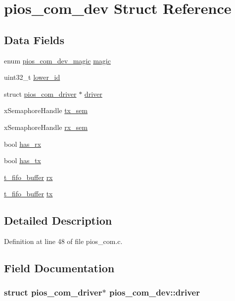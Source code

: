 \hypertarget{structpios__com__dev}{\section{pios\-\_\-com\-\_\-dev \-Struct \-Reference}
\label{structpios__com__dev}
}
\subsection*{\-Data \-Fields}
\begin{DoxyCompactItemize}
\item 
enum \hyperlink{group___p_i_o_s___c_o_m_ga57d90f793d1e8323599fd11e929c945d}{pios\-\_\-com\-\_\-dev\-\_\-magic} \hyperlink{structpios__com__dev_ac886360255eb683d1be8e60bde922e69}{magic}
\item 
uint32\-\_\-t \hyperlink{structpios__com__dev_a3447468fdb0c7996c3669046d48b4cb6}{lower\-\_\-id}
\item 
struct \hyperlink{structpios__com__driver}{pios\-\_\-com\-\_\-driver} $\ast$ \hyperlink{structpios__com__dev_a39cf63f61fa9d8ce12143835c9cbc87e}{driver}
\item 
x\-Semaphore\-Handle \hyperlink{structpios__com__dev_adf20399b709462af4eafca64b6394aa3}{tx\-\_\-sem}
\item 
x\-Semaphore\-Handle \hyperlink{structpios__com__dev_a7fc0be64ae4ec8b66c6cc9fb0d14a912}{rx\-\_\-sem}
\item 
bool \hyperlink{structpios__com__dev_a0ef5c9630be8df13ab50070bbf65009c}{has\-\_\-rx}
\item 
bool \hyperlink{structpios__com__dev_af723f3ee893a43d4ba3fff3e8ff6d3f7}{has\-\_\-tx}
\item 
\hyperlink{structt__fifo__buffer}{t\-\_\-fifo\-\_\-buffer} \hyperlink{structpios__com__dev_a505ae5ef4b8b02aa59d47da4275f9c48}{rx}
\item 
\hyperlink{structt__fifo__buffer}{t\-\_\-fifo\-\_\-buffer} \hyperlink{structpios__com__dev_a7a373bf857434538304aae2c831929c8}{tx}
\end{DoxyCompactItemize}


\subsection{\-Detailed \-Description}


\-Definition at line 48 of file pios\-\_\-com.\-c.



\subsection{\-Field \-Documentation}
\hypertarget{structpios__com__dev_a39cf63f61fa9d8ce12143835c9cbc87e}{
\subsubsection[{driver}]{\setlength{\rightskip}{0pt plus 5cm}struct {\bf pios\-\_\-com\-\_\-driver}$\ast$ {\bf pios\-\_\-com\-\_\-dev\-::driver}}}\label{structpios__com__dev_a39cf63f61fa9d8ce12143835c9cbc87e}


